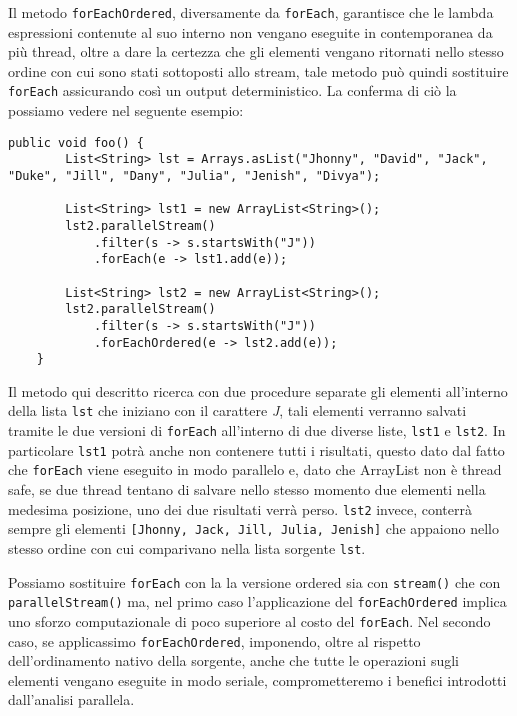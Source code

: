 			Il metodo \lstinline|forEachOrdered|, diversamente da \lstinline|forEach|, garantisce che le lambda espressioni contenute al suo interno non vengano eseguite in contemporanea da più thread, oltre a dare la certezza che gli elementi vengano ritornati nello stesso ordine con cui sono stati sottoposti allo stream, tale metodo può quindi sostituire \lstinline|forEach| assicurando così un output deterministico. La conferma di ciò la possiamo vedere nel seguente esempio:
			\begin{lstlisting}[breaklines=true]
	public void foo() {
		List<String> lst = Arrays.asList("Jhonny", "David", "Jack", "Duke", "Jill", "Dany", "Julia", "Jenish", "Divya");
	
		List<String> lst1 = new ArrayList<String>();
		lst2.parallelStream()
			.filter(s -> s.startsWith("J"))
			.forEach(e -> lst1.add(e));
			
		List<String> lst2 = new ArrayList<String>();
		lst2.parallelStream()
			.filter(s -> s.startsWith("J"))
			.forEachOrdered(e -> lst2.add(e));
	}
			\end{lstlisting}
			Il metodo qui descritto ricerca con due procedure separate gli elementi all'interno della lista \lstinline|lst| che iniziano con il carattere \textit{J}, tali elementi verranno salvati tramite le due versioni di \lstinline|forEach| all'interno di due diverse liste, \lstinline|lst1| e \lstinline|lst2|. In particolare \lstinline|lst1| potrà anche non contenere tutti i risultati, questo dato dal fatto che \lstinline|forEach| viene eseguito in modo parallelo e, dato che ArrayList non è thread safe, se due thread tentano di salvare nello stesso momento due elementi nella medesima posizione, uno dei due risultati verrà perso. \lstinline|lst2| invece, conterrà sempre gli elementi \lstinline|[Jhonny, Jack, Jill, Julia, Jenish]| che appaiono nello stesso ordine con cui comparivano nella lista sorgente \lstinline|lst|.
			
			Possiamo sostituire \lstinline|forEach| con la la versione ordered sia con \lstinline|stream()| che con \lstinline|parallelStream()| ma, nel primo caso l'applicazione del \lstinline|forEachOrdered| implica uno sforzo computazionale di poco superiore al costo del \lstinline|forEach|. Nel secondo caso, se applicassimo \lstinline|forEachOrdered|, imponendo, oltre al rispetto dell'ordinamento nativo della sorgente, anche che tutte le operazioni sugli elementi vengano eseguite in modo seriale, comprometteremo i benefici introdotti dall'analisi parallela. 
			
